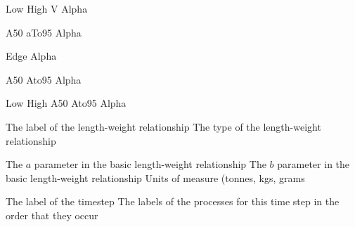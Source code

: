  {Low}
 {High}
 {V}
 {Alpha}
\par\textbf{}\par
{} {A50}
 {aTo95}
 {Alpha}
\par\textbf{}\par
{} {Edge}
 {Alpha}
\par\textbf{}\par
{} {A50}
 {Ato95}
 {Alpha}
\par\textbf{}\par
{} {Low}
 {High}
 {A50}
 {Ato95}
 {Alpha}
\par\par
{} {The label of the length-weight relationship}
 {The type of the length-weight relationship}
\par\textbf{}\par
{} {The $a$ parameter in the basic length-weight relationship}
 {The $b$ parameter in the basic length-weight relationship}
 {Units of measure (tonnes, kgs, grams}
\par\textbf{}\par
{}\par\par
{} {The label of the timestep}
 {The labels of the processes for this time step in the order that they occur}
